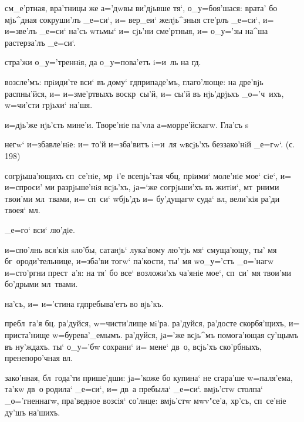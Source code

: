 см_е'ртная, вра'тницы же а='дwвы ви'дjьвше тя`, 
о_у=боя'шася: врата' бо мjь^дная сокруши'лъ _е=си`, и= 
вер_еи` желjь^зныя сте'рлъ _е=си`, и= и=зве'лъ _е=си` 
на'съ w\т тьмы` и= сjь'ни сме'ртныя, и= о_у='зы на^ша 
растерза'лъ _е=си`.

стра'жи о_у='треннiя, да о_у=пова'етъ i=и~ль на гд.

возсле'мъ: прiиди'те вси` въ дому` гд припаде'мъ, 
глаго'люще: на дре'вjь распны'йся, и= и=з\ъ ме'ртвыхъ 
воскр~сы'й, и= сы'й въ нjь'дрjьхъ _о='ч~ихъ, w=чи'сти 
грjьхи` на'шя.

и=дjь'же нjь'сть мине'и. Творе'нiе па'vла а=морре'йскагw. 
Гла'съ s~%


негw` и=збавле'нiе: и= то'й и=зба'витъ i=и~ля w\т всjь'хъ 
беззако'нiй _е=гw`. (с. 198)

согрjьша'ющихъ сп~се'нiе, мр~i'е всепjь'тая ч бц, 
прiими` моле'нiе мое` сiе`, и= и=спроси' ми разрjьше'нiя 
всjь'хъ, jа=`же согрjьши'хъ въ житiи`, мт~рними твои'ми 
мл~твами, и= сп~си` w\т бjь'дъ и= бу'дущагw суда` 
вл, вели'кiя ра'ди твоея` мл.

_е=го` вси` лю'дiе.

и=спо'лнь вся'кiя sло'бы, сатанjь` лука'вому лю'тjь мя` 
смуща'ющу, ты' мя бг~ороди'тельнице, и=зба'ви тогw` 
па'кости, ты' мя w\т о_у='стъ _о='нагw и=сто'ргни 
прест~а'я: на тя' бо все` возложи'хъ ча'янiе мое`, сп~си' 
мя твои'ми бо'дрыми мл~твами.

на'съ, и= и='стина гд пребыва'етъ во вjь'къ.

пребл~га'я бц. ра'дуйся, w=чисти'лище мi'ра. ра'дуйся, 
ра'досте скорбя'щихъ, и= приста'нище w=бурева'_емымъ. 
ра'дуйся, jа='же всjь^мъ помога'ющая су'щымъ въ ну'ждахъ. 
ты` о_у='бw сохрани` и= мене` дв~о, всjь'хъ ско'рбныхъ, 
пренепоро'чная вл.

зако'нная, бл~года'ти прише'дши: jа='коже бо купина` не 
сгара'ше w=паля'ема, та'кw дв~о родила` _е=си`, и= дв~а 
пребыла` _е=си`. вмjь'стw столпа` _о='гненнагw, 
пра'ведное возсiя` со'лнце: вмjь'стw мwv"се'а, хр'съ, 
сп~се'нiе ду'шъ на'шихъ.

